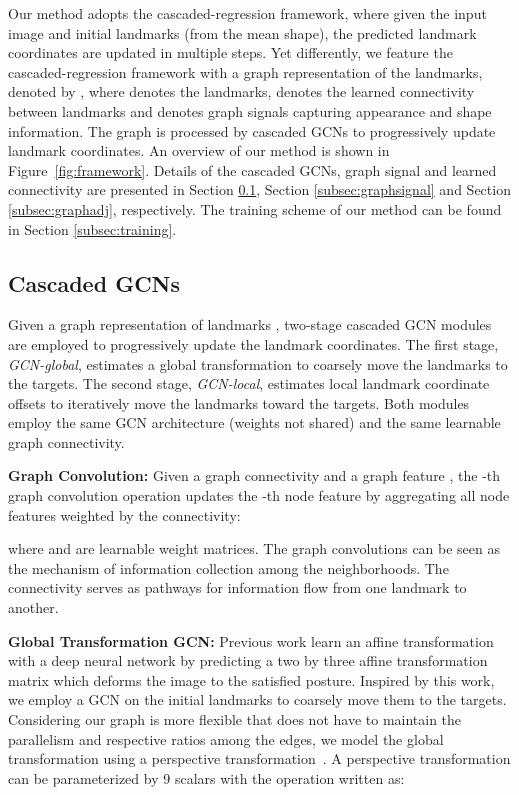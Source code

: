 \documentclass[runningheads]{llncs}
\begin{document}
Our method adopts the cascaded-regression framework, where given the input image and initial landmarks (from the mean shape), the predicted landmark coordinates are updated in multiple steps. Yet differently, we feature the cascaded-regression framework with a graph representation of the landmarks, denoted by , where  denotes the landmarks,  denotes the learned connectivity between landmarks and  denotes graph signals capturing appearance and shape information. The graph is processed by cascaded GCNs to progressively update landmark coordinates. An overview of our method is shown in Figure~\ref{fig:framework}. Details of the cascaded GCNs, graph signal and learned connectivity are presented in Section \ref{subsec:gcn}, Section \ref{subsec:graphsignal} and Section \ref{subsec:graphadj}, respectively. The training scheme of our method can be found in Section \ref{subsec:training}.

\subsection{Cascaded GCNs}
\label{subsec:gcn}

Given a graph representation of landmarks , two-stage cascaded GCN modules are employed to progressively update the landmark coordinates. The first stage, \textit{GCN-global}, estimates a global transformation to coarsely move the landmarks to the targets. The second stage, \textit{GCN-local}, estimates local landmark coordinate offsets to iteratively move the landmarks toward the targets. Both modules employ the same GCN architecture (weights not shared) and the same learnable graph connectivity. 

\textbf{Graph Convolution:} 
Given a graph connectivity  and a graph feature , the -th graph convolution operation updates the -th node feature  by aggregating all node features weighted by the connectivity:

where  and  are learnable weight matrices. The graph convolutions can be seen as the mechanism of information collection among the neighborhoods. The connectivity  serves as pathways for information flow from one landmark to another. 

\textbf{Global Transformation GCN:} 
Previous work \cite{jaderberg2015spatial,lv2017deep} learn an affine transformation with a deep neural network by predicting a two by three affine transformation matrix which deforms the image to the satisfied posture. Inspired by this work, we employ a GCN on the initial landmarks to coarsely move them to the targets. Considering our graph is more flexible that does not have to maintain the parallelism and respective ratios among the edges, we model the global transformation using a perspective transformation~\cite{detone2016deep}. A perspective transformation can be parameterized by 9 scalars  with the operation written as:
\end{document}
